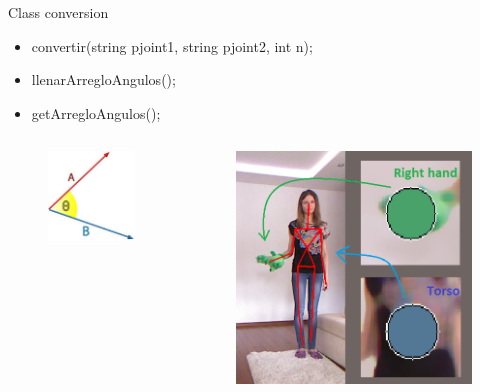 \documentclass{beamer}
\begin{document}
\begin{frame}

Class conversion
 
\begin{itemize}
\item convertir(string pjoint1, string pjoint2, int n);
\item llenarArregloAngulos();
\item getArregloAngulos();
\end{itemize}



\end{frame}

\begin{frame}

\begin{columns}[c] %

\begin{figure}
\includegraphics[width=0.45\linewidth]{punto.JPG}
\end{figure}


\begin{figure}
\includegraphics[width=0.7\linewidth]{conversion.png}
\end{figure}


\end{columns}
\end{frame}
\end{document}
